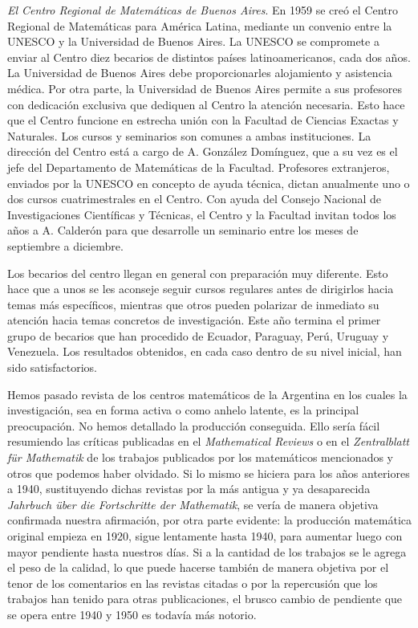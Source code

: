 \emph{El Centro Regional de Matemáticas de Buenos Aires}. En 1959 se creó el
Centro Regional de Matemáticas para América Latina, mediante un convenio entre
la UNESCO y la Universidad de Buenos Aires. La UNESCO se compromete a enviar al
Centro diez becarios de distintos países latinoamericanos, cada dos años. La
Universidad de Buenos Aires debe proporcionarles alojamiento y asistencia
médica. Por otra parte, la Universidad de Buenos Aires permite a sus profesores
con dedicación exclusiva que dediquen al Centro la atención necesaria. Esto
hace que el Centro funcione en estrecha unión con la Facultad de Ciencias
Exactas y Naturales. Los cursos y seminarios son comunes a ambas instituciones.
La dirección del Centro está a cargo de A. González Domínguez, que a su vez es
el jefe del Departamento de Matemáticas de la Facultad. Profesores extranjeros,
enviados por la UNESCO en concepto de ayuda técnica, dictan anualmente uno o
dos cursos cuatrimestrales en el Centro.  Con ayuda del Consejo Nacional de
Investigaciones Científicas y Técnicas, el Centro y la Facultad invitan todos
los años a A. Calderón para que desarrolle un seminario entre los meses de
septiembre a diciembre. 

Los becarios del centro llegan en general con preparación muy diferente. Esto
hace que a unos se les aconseje seguir cursos regulares antes de dirigirlos
hacia temas más específicos, mientras que otros pueden polarizar de inmediato
su atención hacia temas concretos de investigación. Este año termina el primer
grupo de becarios que han procedido de Ecuador, Paraguay, Perú, Uruguay y
Venezuela. Los resultados obtenidos, en cada caso dentro de su nivel inicial,
han sido satisfactorios.

Hemos pasado revista de los centros matemáticos de la Argentina en los cuales
la investigación, sea en forma activa o como anhelo latente, es la principal
preocupación. No hemos detallado la producción conseguida. Ello sería fácil
resumiendo las críticas publicadas en el \emph{Mathematical Reviews} o en el
\emph{Zentralblatt f\"ur Mathematik} de los trabajos publicados por los
matemáticos mencionados y otros que podemos haber olvidado. Si lo mismo se
hiciera para los años anteriores a 1940, sustituyendo dichas revistas por la
más antigua y ya desaparecida \emph{Jahrbuch \"uber die Fortschritte der
Mathematik}, se vería de manera objetiva confirmada nuestra afirmación, por
otra parte evidente: la producción matemática original empieza en 1920, sigue
lentamente hasta 1940, para aumentar luego con mayor pendiente hasta nuestros
días. Si a la cantidad de los trabajos se le agrega el peso de la calidad, lo
que puede hacerse también de manera objetiva por el tenor de los comentarios en
las revistas citadas o por la repercusión que los trabajos han tenido para
otras publicaciones, el brusco cambio de pendiente que se opera entre 1940 y
1950 es todavía más notorio.

